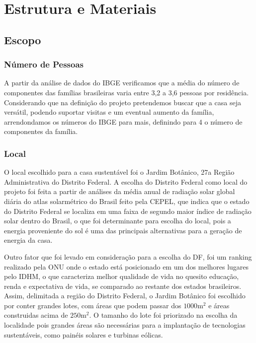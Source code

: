 \chapter{Estrutura e Materiais}

\section{Escopo}

\subsection{Número de Pessoas}

	A partir da análise de dados do IBGE\cite{2010IBGE} verificamos que a média do número de componentes das famílias brasileiras varia entre 3,2 a 3,6 pessoas por residência. Considerando que na definição do projeto pretendemos buscar que a casa seja versátil, podendo suportar visitas e um eventual aumento da família, arrendondamos os números do IBGE\cite{2010IBGE} para mais, definindo para 4 o número de componentes da família. 


\subsection{Local}

	O local escolhido para a casa sustentável foi o Jardim Botânico, 27a Região Administrativa do Distrito Federal. A escolha do Distrito Federal como local do projeto foi feita a partir de análises da média anual de radiação solar global diária do atlas solarmétrico do Brasil feito pela CEPEL, que indica que o estado do Distrito Federal se localiza em uma faixa de segundo maior índice de radiação solar dentro do Brasil, o que foi determinante para escolha do local, pois a energia proveniente do sol é uma das principais alternativas para a geração de energia da casa.
	
	Outro fator que foi levado em consideração para a escolha do DF, foi um ranking realizado pela ONU onde o estado está posicionado em um dos melhores lugares pelo IDHM, o que caracteriza melhor qualidade de vida no quesito educação, renda e expectativa de vida, se comparado ao restante dos estados brasileiros. Assim, delimitada a região do Distrito Federal, o Jardim Botânico foi escolhido por conter grandes lotes, com áreas que podem passar dos $1000\si{\meter}^{2}$\cite{2010Terracap} e áreas construidas acima de $250\si{\meter}^{2}$\cite{2014Codeplan}. O tamanho do lote foi priorizado na escolha da localidade pois grandes áreas são necessárias para a implantação de tecnologias sustentáveis, como painéis solares e turbinas eólicas.
	
